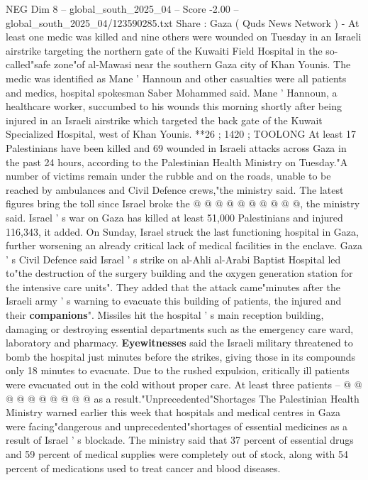 \begin{textsample}{NEG Dim 8 – global\_south\_2025\_04 – Score -2.00 – global\_south\_2025\_04/123590285.txt}  \label{ex:f8_neg_046}
Share : Gaza ( Quds News Network ) - At least one medic was killed and nine others were wounded on Tuesday in an Israeli airstrike targeting the northern gate of the Kuwaiti Field Hospital in the so-called"safe zone"of al-Mawasi near the southern Gaza city of Khan Younis.
The medic was identified as Mane ' Hannoun and other casualties were all patients and medics, hospital spokesman Saber Mohammed said.
Mane ' Hannoun, a healthcare worker, succumbed to his wounds this morning shortly after being injured in an Israeli airstrike which targeted the back gate of the Kuwait Specialized Hospital, west of Khan Younis. **26 ; 1420 ; TOOLONG At least 17 Palestinians have been killed and 69 wounded in Israeli attacks across Gaza in the past 24 hours, according to the Palestinian Health Ministry on Tuesday."A number of victims remain under the rubble and on the roads, unable to be reached by ambulances and Civil Defence crews,"the ministry said.
The latest figures bring the toll since Israel broke the @ @ @ @ @ @ @ @ @ @, the ministry said.
Israel ' s war on Gaza has killed at least 51,000 Palestinians and injured 116,343, it added.
On Sunday, Israel struck the last functioning hospital in Gaza, further worsening an already critical lack of medical facilities in the enclave.
Gaza ' s Civil Defence said Israel ' s strike on al-Ahli al-Arabi Baptist Hospital led to"the destruction of the surgery building and the oxygen generation station for the intensive care units".
They added that the attack came"minutes after the Israeli army ' s warning to evacuate this building of patients, the injured and their \textbf{companions}".
Missiles hit the hospital ' s main reception building, damaging or destroying essential departments such as the emergency care ward, laboratory and pharmacy. \textbf{Eyewitnesses} said the Israeli military threatened to bomb the hospital just minutes before the strikes, giving those in its compounds only 18 minutes to evacuate.
Due to the rushed expulsion, critically ill patients were evacuated out in the cold without proper care.
At least three patients -- @ @ @ @ @ @ @ @ @ @ as a result."Unprecedented"Shortages The Palestinian Health Ministry warned earlier this week that hospitals and medical centres in Gaza were facing"dangerous and unprecedented"shortages of essential medicines as a result of Israel ' s blockade.
The ministry said that 37 percent of essential drugs and 59 percent of medical supplies were completely out of stock, along with 54 percent of medications used to treat cancer and blood diseases.

\end{textsample}
